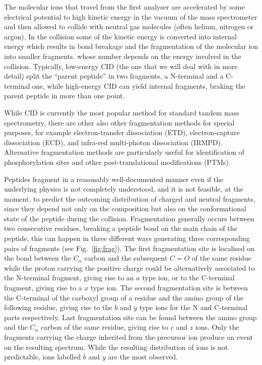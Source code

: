 The molecular ions that travel from the first analyser are
accelerated by some electrical potential to high kinetic energy in the vacuum of
the mass spectrometer and then allowed to collide with neutral gas molecules
(often helium, nitrogen or argon). In the collision some of the kinetic energy
is converted into internal energy which results in bond breakage and the
fragmentation of the molecular ion into smaller fragments. 
whose number depends on the energy involved in the collision. Typically,
low-energy CID (the one that we will deal with in more detail) split the
``parent peptide'' in two fragments, a N-terminal and a C-terminal one, while
high-energy CID can yield internal fragments, braking the parent peptide in more
than one point.

While CID is currently the most popular method for standard tandem
mass spectrometry, there are other also other fragmentation methods for special
purposes, for example electron-transfer dissociation (ETD), electron-capture
dissociation (ECD), and infra-red multi-photon dissociation (IRMPD). Alternative
fragmentation methods are particularly useful for identification of
phosphorylation sites and other post-translational modifications
(PTMs).

Peptides fragment in a reasonably well-documented manner
\cite{roepstorff1984nomenclature,johnson1989interpretation} even if the
underlying physics is not completely understood, and it is not feasible, at the
moment, to predict the outcoming distribution of charged and neutral fragments,
since they depend not only on the composition but also on the conformational
state of the peptide during the
collision\cite{dancik1999,gygi2004nature,Wan2006,Zhang2004}. 
Fragmentation generally occurs between two consecutive residues, breaking a
peptide bond on the main chain of the peptide, this can happen in three different ways generating three
corresponding pairs of fragments (see Fig.~\ref{fig:frag}).
The first fragmentation site is localised on the bond between the $C_\alpha$ carbon
and the subsequent $C=O$ of the same residue while the proton carrying the
positive charge could be alternatively associated to the N-terminal fragment,
giving rise to an $a$ type ion, or to the C-terminal fragment, giving rise to a
$x$ type ion.
The second fragmentation site is between the C-terminal of the carboxyl group of a
residue and the amino group of the following residue, giving rise to the $b$
and $y$ type ions for the N and C-terminal parts respectively.
Last fragmentation site can be found between the amino group and the $C_\alpha$
carbon of the same residue, giving rise to $c$ and $z$ ions.
\cite{roepstorff1984nomenclature,Johnson1987}
Only the fragments carrying the charge inherited from the precursor ion produce
an event on the resulting spectrum.
While the resulting distribution of ions is not predictable, ions labelled $b$
and $y$ are the most observed.

